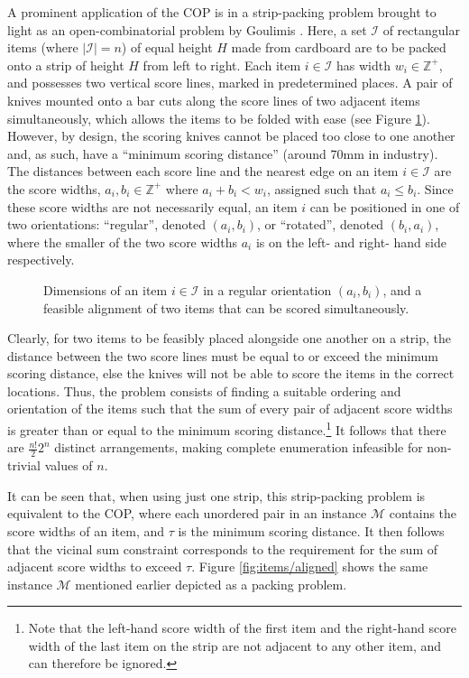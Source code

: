 \documentclass[runningheads]{llncs}
\begin{document}
A prominent application of the COP is in a strip-packing problem brought to light as an open-combinatorial problem by Goulimis \cite{goulimis2004}. Here, a set $\mathcal{I}$ of rectangular items (where $|\mathcal{I}| = n$) of equal height $H$ made from cardboard are to be packed onto a strip of height $H$ from left to right. Each item $i \in \mathcal{I}$ has width $w_i \in \mathbb{Z}^{+}$, and possesses two vertical score lines, marked in predetermined places. A pair of knives mounted onto a bar cuts along the score lines of two adjacent items simultaneously, which allows the items to be folded with ease (see Figure \ref{fig:itemsknife}). However, by design, the scoring knives cannot be placed too close to one another and, as such, have a ``minimum scoring distance'' (around 70mm in industry). The distances between each score line and the nearest edge on an item $i \in \mathcal{I}$ are the score widths, $a_i, b_i \in \mathbb{Z}^{+}$ where $a_i + b_i < w_i$, assigned such that $a_i \leq b_i$. Since these score widths are not necessarily equal, an item $i$ can be positioned in one of two orientations: ``regular'', denoted $(a_i, b_i)$, or ``rotated'', denoted $(b_i, a_i)$, where the smaller of the two score widths $a_i$ is on the left- and right- hand side respectively. 
\begin{figure}[H]	
	\centering
	
	\caption{Dimensions of an item $i \in \mathcal{I}$ in a regular orientation $(a_i, b_i)$, and a feasible alignment of two items that can be scored simultaneously.}	
	\label{fig:itemsknife}
\end{figure}
\noindent Clearly, for two items to be feasibly placed alongside one another on a strip, the distance between the two score lines must be equal to or exceed the minimum scoring distance, else the knives will not be able to score the items in the correct locations. Thus, the problem consists of finding a suitable ordering and orientation of the items such that the sum of every pair of adjacent score widths is greater than or equal to the minimum scoring distance.\footnote{Note that the left-hand score width of the first item and the right-hand score width of the last item on the strip are not adjacent to any other item, and can therefore be ignored.} It follows that there are $\frac{n!}{2}2^n$ distinct arrangements, making complete enumeration infeasible for non-trivial values of $n$.

It can be seen that, when using just one strip, this strip-packing problem is equivalent to the COP, where each unordered pair in an instance $\mathcal{M}$ contains the score widths of an item, and $\tau$ is the minimum scoring distance. It then follows that the vicinal sum constraint corresponds to the requirement for the sum of adjacent score widths to exceed $\tau$. Figure \ref{fig:items/aligned} shows the same instance $\mathcal{M}$ mentioned earlier depicted as a packing problem. 
\end{document}
